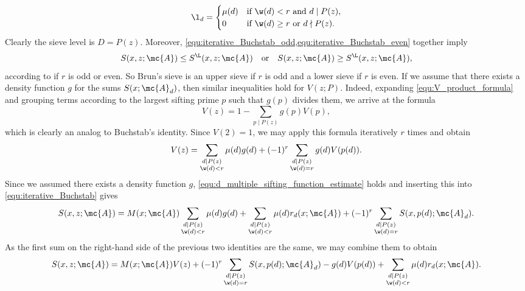     \[
      \l_{d} = \begin{cases} \mu(d) & \text{if $\w(d) < r$ and $d \mid P(z)$}, \\ 0 & \text{if $\w(d) \ge r$ or $d \nmid P(z)$}. \end{cases}
    \]
    Clearly the sieve level is $D = P(z)$. Moreover, \cref{equ:iterative_Buchstab_odd,equ:iterative_Buchstab_even} together imply
    \[
      S(x,z;\mc{A}) \le S^{\L}(x,z;\mc{A}) \quad \text{or} \quad S(x,z;\mc{A}) \ge S^{\L}(x,z;\mc{A}),
    \]
    according to if $r$ is odd or even. So Brun's sieve is an upper sieve if $r$ is odd and a lower sieve if $r$ is even. If we assume that there exists a density function $g$ for the sums $S(x;\mc{A}_{d})$, then similar inequalities hold for $V(z;P)$. Indeed, expanding \cref{equ:V_product_formula} and grouping terms according to the largest sifting prime $p$ such that $g(p)$ divides them, we arrive at the formula
    \[
      V(z) = 1-\sum_{p \mid P(z)}g(p)V(p),
    \]
    which is clearly an analog to Buchstab's identity. Since $V(2) = 1$, we may apply this formula iteratively $r$ times and obtain
    \[
      V(z) = \sum_{\substack{d \mid P(z) \\ \w(d) < r}}\mu(d)g(d)+(-1)^{r}\sum_{\substack{d \mid P(z) \\ \w(d) = r}}g(d)V(p(d)).
    \]
    Since we assumed there exists a density function $g$, \cref{equ:d_multiple_sifting_function_estimate} holds and inserting this into \cref{equ:iterative_Buchstab} gives
    \[
      S(x,z;\mc{A}) = M(x;\mc{A})\sum_{\substack{d \mid P(z) \\ \w(d) < r}}\mu(d)g(d)+\sum_{\substack{d \mid P(z) \\ \w(d) < r}}\mu(d)r_{d}(x;\mc{A})+(-1)^{r}\sum_{\substack{d \mid P(z) \\ \w(d) = r}}S(x,p(d);\mc{A}_{d}).
    \]
    As the first sum on the right-hand side of the previous two identities are the same, we may combine them to obtain
    \[
      S(x,z;\mc{A}) = M(x;\mc{A})V(z)+(-1)^{r}\sum_{\substack{d \mid P(z) \\ \w(d) = r}}S(x,p(d);\mc{A}_{d})-g(d)V(p(d))+\sum_{\substack{d \mid P(z) \\ \w(d) < r}}\mu(d)r_{d}(x;\mc{A}).
    \]
